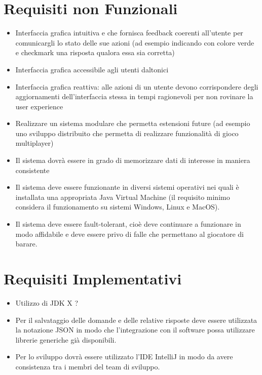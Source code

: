 	\section{Requisiti non Funzionali}
        \begin{itemize}
            \item Interfaccia grafica intuitiva e che fornisca feedback coerenti all'utente per comunicargli lo stato delle sue azioni (ad esempio indicando con colore verde e checkmark una risposta qualora essa sia corretta)
            \item Interfaccia grafica accessibile agli utenti daltonici
            \item Interfaccia grafica reattiva: alle azioni di un utente devono corrispondere degli aggiornamenti dell'interfaccia stessa in tempi ragionevoli per non rovinare la user experience
            \item Realizzare un sistema modulare che permetta estensioni future (ad esempio uno sviluppo distribuito che permetta di realizzare funzionalità di gioco multiplayer)
            \item Il sistema dovrà essere in grado di memorizzare dati di interesse in maniera consistente
            \item Il sistema deve essere funzionante in diversi sistemi operativi nei quali è installata una appropriata Java Virtual Machine (il requisito minimo considera il funzionamento su sistemi Windows, Linux e MacOS).
            \item Il sistema deve essere fault-tolerant, cioè deve continuare a funzionare in modo affidabile e deve essere privo di falle che permettano al giocatore di barare.
        
        \end{itemize}

	\section{Requisiti Implementativi}
        \begin{itemize}
            \item Utilizzo di JDK X ?
            \item Per il salvataggio delle domande e delle relative risposte deve essere utilizzata la notazione JSON in modo che l'integrazione con il software possa utilizzare librerie generiche già disponibili.
            \item Per lo sviluppo dovrà essere utilizzato l'IDE IntelliJ in modo da avere consistenza tra i membri del team di sviluppo.
        \end{itemize}

	